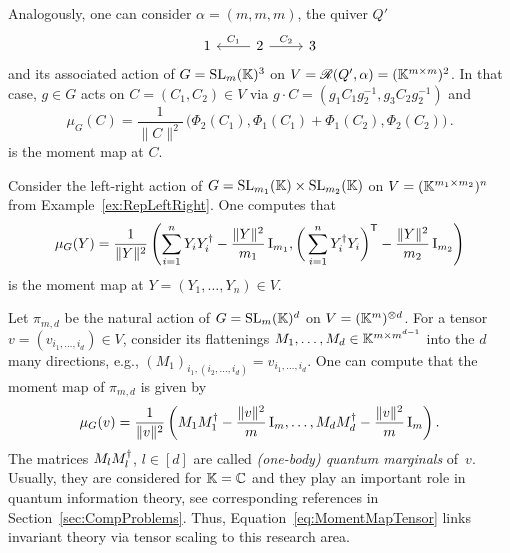 \begin{example}
	Analogously, one can consider $\alpha = (m,m,m)$, the quiver $Q'$
	\begin{equation}\label{eq:ThreeSourceQuiver}
	 	\begin{tikzcd}
	 		1 & 2 \ar[l, "C_1" '] \ar[r, "C_2"] & 3 
	 	\end{tikzcd}
	\end{equation}
	and its associated action of $G = \operatorname{SL}_m(\mathbb K)^3$ on $V = \mathscr{R}(Q', \alpha) = (\mathbb K^{m \times m})^2$. In that case, $g \in G$ acts on $C = (C_1,C_2) \in V$ via $g \cdot C = (g_1 C_1 g_2^{-1} , g_3 C_2 g_2^{-1})$ and
		\begin{equation}\label{eq:SourceMomentMap}
	 		\mu_G(C) = \frac{1}{\|C\|^2} \, \big( \Phi_2(C_1), \Phi_1(C_1) + \Phi_1(C_2), \Phi_2(C_2) \big) \, .
		\end{equation}
	is the moment map at $C$.
	\hfill\exSymbol
\end{example}

\begin{example} \label{ex:MomentMapLeftRight}
	Consider the left-right action of $G = \operatorname{SL}_{m_1}(\mathbb K) \times \operatorname{SL}_{m_2}(\mathbb K)$ on $V = (\mathbb K^{m_1 \times m_2})^n$ from Example~\ref{ex:RepLeftRight}. One computes that
	\begin{equation}\label{eq:MomentMapLeftRight}
		\mu_G(Y) = \frac{1}{\|Y\|^2} \left( \sum_{i=1}^n Y_i Y_i^{\dagger} - \frac{\|Y\|^2}{m_1} \operatorname{I}_{m_1}, \bigg( \sum_{i=1}^n Y_i^{\dagger} Y_i \bigg)^{\mathsf{T}} -  \frac{\|Y\|^2}{m_2} \operatorname{I}_{m_2} \right)
	\end{equation}
	is the moment map at $Y = (Y_1,\ldots,Y_n) \in V$.
	\hfill\exSymbol
\end{example}

\begin{example} \label{ex:MomentMapTensorScaling}
	Let $\pi_{m,d}$ be the natural action of $G = \operatorname{SL}_m(\mathbb K)^d$ on $V = (\mathbb K^m)^{\otimes d}$. For a tensor $v = (v_{i_1,\ldots,i_d}) \in V$, consider its flattenings $M_1,\ldots,M_d \in \mathbb K^{m \times m^{d-1}}$ into the $d$ many directions, e.g., $(M_1)_{i_1,(i_2,\ldots,i_d)} = v_{i_1,\ldots,i_d}$. One can compute that the moment map of $\pi_{m,d}$ is given by
		\begin{equation}\label{eq:MomentMapTensor}
			\mu_G(v) = \frac{1}{\|v\|^2} \left( M_1 M_1^{\dagger} - \frac{\|v\|^2}{m} \operatorname{I}_m, \ldots, M_d M_d^{\dagger} - \frac{\|v\|^2}{m} \operatorname{I}_m \right) .
		\end{equation}
	The matrices $M_{l} M_l^{\dagger}$, $l \in [d]$ are called \emph{(one-body) quantum marginals} of~$v$.
	Usually, they are considered for $\mathbb K = \mathbb C$ and they play an important role in quantum information theory, see corresponding references in Section~\ref{sec:CompProblems}. Thus, Equation~\eqref{eq:MomentMapTensor} links invariant theory via tensor scaling to this research area.
	\hfill\exSymbol
\end{example}




